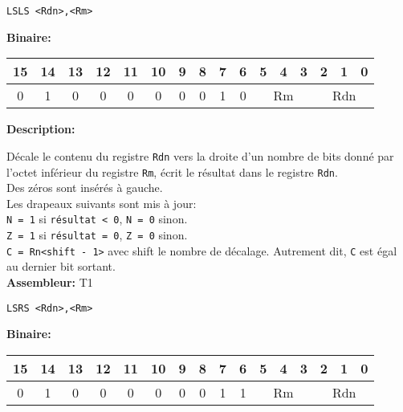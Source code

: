 \documentclass{article}
\begin{document}
    \begin{lstlisting}
LSLS <Rdn>,<Rm>
    \end{lstlisting}

    \textbf{Binaire:}

    \begin{tabular}{| c c c c c c c c c c c c c c c c |}
        \hline
        15 & 14 & 13 & 12 & 11 & 10 & \multicolumn{1}{|c}{9} & 8 & 7 & 6 & \multicolumn{1}{|c}{5} & 4 & 3 & \multicolumn{1}{|c}{2} & 1 & 0 \\
        \hline
        0 & 1 & 0 & 0 & 0 & 0 & \multicolumn{1}{|c}{0} & 0 & 1 & 0 & \multicolumn{3}{|c}{Rm} & \multicolumn{3}{|c|}{Rdn} \\
        \hline
    \end{tabular}




    \textbf{Description: }

    Décale le contenu du registre \texttt{Rdn} vers la droite d'un nombre de bits donné par l'octet inférieur du registre \texttt{Rm}, écrit le résultat dans le registre \texttt{Rdn}.\\
    Des zéros sont insérés à gauche.\\
    Les drapeaux suivants sont mis à jour:\\
    \texttt{N = 1} si \texttt{résultat < 0}, \texttt{N = 0} sinon.\\
    \texttt{Z = 1} si \texttt{résultat = 0}, \texttt{Z = 0} sinon.\\
    \texttt{C = Rn<shift - 1>} avec shift le nombre de décalage.
    Autrement dit, \texttt{C} est égal au dernier bit sortant.\\

    \textbf{Assembleur:} T1

    \begin{lstlisting}
LSRS <Rdn>,<Rm>
    \end{lstlisting}

    \textbf{Binaire:}

    \begin{tabular}{| c c c c c c c c c c c c c c c c |}
        \hline
        15 & 14 & 13 & 12 & 11 & 10 & \multicolumn{1}{|c}{9} & 8 & 7 & 6 & \multicolumn{1}{|c}{5} & 4 & 3 & \multicolumn{1}{|c}{2} & 1 & 0 \\
        \hline
        0 & 1 & 0 & 0 & 0 & 0 & \multicolumn{1}{|c}{0} & 0 & 1 & 1 & \multicolumn{3}{|c}{Rm} & \multicolumn{3}{|c|}{Rdn} \\
        \hline
    \end{tabular}
\end{document}
